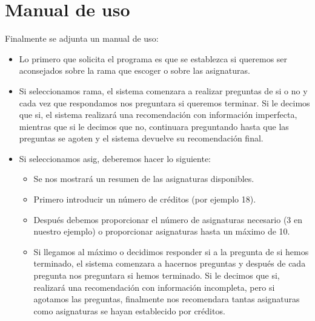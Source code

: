 \chapter{Manual de uso}
Finalmente se adjunta un manual de uso:
\begin{itemize}
   \item Lo primero que solicita el programa es que se establezca si queremos ser aconsejados sobre la rama que escoger o sobre las asignaturas.
   \item Si seleccionamos rama, el sistema comenzara a realizar preguntas de si o no y cada vez que respondamos nos preguntara si queremos terminar. Si le decimos que si, el sistema realizará una recomendación con información imperfecta, mientras que si le decimos que no, continuara preguntando hasta que las preguntas se agoten y el sistema devuelve su recomendación final.
   \item Si seleccionamos asig, deberemos hacer lo siguiente:
   \begin{itemize}
      \item Se nos mostrará un resumen de las asignaturas disponibles.
      \item Primero introducir un número de créditos (por ejemplo 18).
      \item Después debemos proporcionar el número de asignaturas necesario (3 en nuestro ejemplo) o proporcionar asignaturas hasta un máximo de 10.
      \item Si llegamos al máximo o decidimos responder si a la pregunta de si hemos terminado, el sistema comenzara a hacernos preguntas y después de cada pregunta nos preguntara si hemos terminado. Si le decimos que si, realizará una recomendación con información incompleta, pero si agotamos las preguntas, finalmente nos recomendara tantas asignaturas como asignaturas se hayan establecido por créditos.
   \end{itemize}
\end{itemize}
